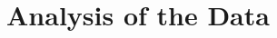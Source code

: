 \documentclass{include/protokollclass}
\begin{document}
    \FrontMatter


    \begingroup \let\clearpage\relax    %
    \tableofcontents                    %
    \listoffigures
    \listoftables
    \endgroup



    \MainMatter
    
    \chapter{Analysis of the Data}




    \TheBibliography

    
    

\end{document}
